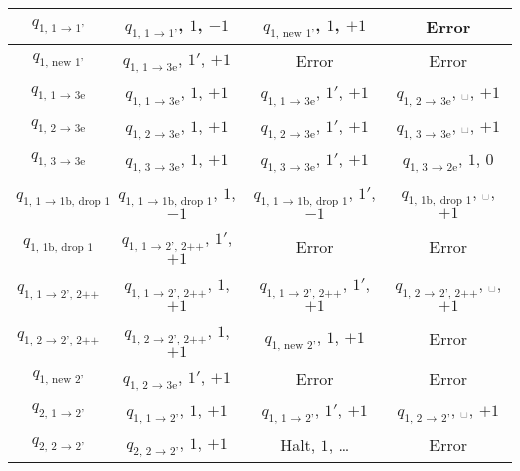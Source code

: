 \documentclass[12pt,a4paper]{article}
\newcommand{\spacesymbol}{\ensuremath{\text{\textvisiblespace}}}
\begin{document}
\begin{enumproblem}
\begin{table}[H]
\begin{tabular}{c||c|c|c}
                \hline
                $q_{\text{1, 1 $\to$ 1'}}$& $q_{\text{1, 1 $\to$ 1'}}$, $1$, $-1$& $q_{\text{1, new 1'}}$, $1$, $+1$& Error\\
                \hline
                $q_{\text{1, new 1'}}$& $q_{\text{1, 1 $\to$ 3e}}$, $1'$, $+1$& Error& Error\\
                \hline
                $q_{\text{1, 1 $\to$ 3e}}$& $q_{\text{1, 1 $\to$ 3e}}$, $1$, $+1$& $q_{\text{1, 1 $\to$ 3e}}$, $1'$, $+1$& $q_{\text{1, 2 $\to$ 3e}}$, \spacesymbol, $+1$\\
                \hline
                $q_{\text{1, 2 $\to$ 3e}}$& $q_{\text{1, 2 $\to$ 3e}}$, $1$, $+1$& $q_{\text{1, 2 $\to$ 3e}}$, $1'$, $+1$& $q_{\text{1, 3 $\to$ 3e}}$, \spacesymbol, $+1$\\
                \hline
                $q_{\text{1, 3 $\to$ 3e}}$& $q_{\text{1, 3 $\to$ 3e}}$, $1$, $+1$& $q_{\text{1, 3 $\to$ 3e}}$, $1'$, $+1$& $q_{\text{1, 3 $\to$ 2e}}$, $1$, $0$\\
                \hline
                $q_{\text{1, 1 $\to$ 1b, drop 1}}$& $q_{\text{1, 1 $\to$ 1b, drop 1}}$, $1$, $-1$& $q_{\text{1, 1 $\to$ 1b, drop 1}}$, $1'$, $-1$& $q_{\text{1, 1b, drop 1}}$, \spacesymbol, $+1$\\
                \hline
                $q_{\text{1, 1b, drop 1}}$& $q_{\text{1, 1 $\to$ 2', 2++}}$, $1'$, $+1$& Error& Error\\
                \hline
                $q_{\text{1, 1 $\to$ 2', 2++}}$& $q_{\text{1, 1 $\to$ 2', 2++}}$, $1$, $+1$& $q_{\text{1, 1 $\to$ 2', 2++}}$, $1'$, $+1$& $q_{\text{1, 2 $\to$ 2', 2++}}$, \spacesymbol, $+1$\\
                \hline
                $q_{\text{1, 2 $\to$ 2', 2++}}$& $q_{\text{1, 2 $\to$ 2', 2++}}$, $1$, $+1$& $q_{\text{1, new 2'}}$, $1$, $+1$& Error\\
                \hline
                $q_{\text{1, new 2'}}$& $q_{\text{1, 2 $\to$ 3e}}$, $1'$, $+1$& Error& Error\\
                \hline
                $q_{\text{2, 1 $\to$ 2'}}$& $q_{\text{1, 1 $\to$ 2'}}$, $1$, $+1$& $q_{\text{1, 1 $\to$ 2'}}$, $1'$, $+1$& $q_{\text{1, 2 $\to$ 2'}}$, \spacesymbol, $+1$\\
                \hline
                $q_{\text{2, 2 $\to$ 2'}}$& $q_{\text{2, 2 $\to$ 2'}}$, $1$, $+1$& Halt, $1$, \dots& Error\\
            \end{tabular}
        \end{table}
    \end{enumproblem}
    
\end{document}
